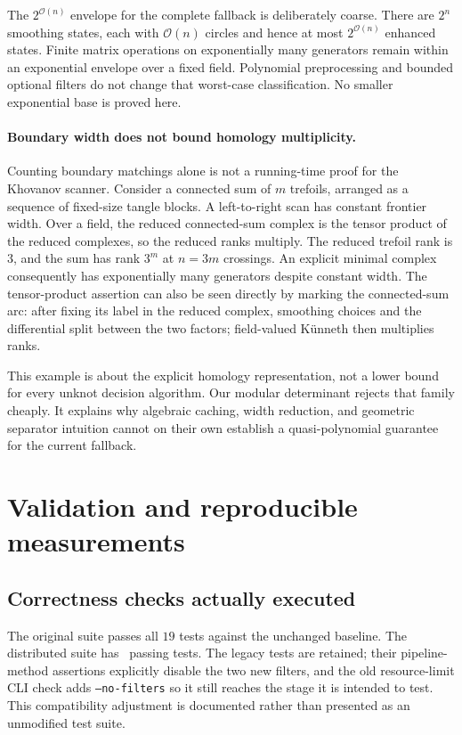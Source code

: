 \documentclass[11pt]{article}
\theoremstyle{remark}\newtheorem{remark}[theorem]{Remark}
\newcommand{\OO}{\mathcal O}
\newcommand{\code}[1]{\texttt{\small #1}}
\begin{document}
The $2^{\OO(n)}$ envelope for the complete fallback is deliberately coarse.
There are $2^n$ smoothing states, each with $\OO(n)$ circles and hence at
most $2^{\OO(n)}$ enhanced states. Finite matrix operations on exponentially
many generators remain within an exponential envelope over a fixed field.
Polynomial preprocessing and bounded optional filters do not change that
worst-case classification. No smaller exponential base is proved here.

\paragraph{Boundary width does not bound homology multiplicity.}
Counting boundary matchings alone is not a running-time proof for the
Khovanov scanner. Consider a connected sum of $m$ trefoils, arranged as a
sequence of fixed-size tangle blocks. A left-to-right scan has constant
frontier width. Over a field, the reduced connected-sum complex is the
tensor product of the reduced complexes, so the reduced ranks multiply.
The reduced trefoil rank is $3$, and the sum has rank $3^m$ at $n=3m$
crossings. An explicit minimal complex consequently has exponentially
many generators despite constant width. The tensor-product assertion can
also be seen directly by marking the connected-sum arc: after fixing its
label in the reduced complex, smoothing choices and the differential split
between the two factors; field-valued K\"unneth then multiplies ranks.

This example is about the explicit homology representation, not a lower
bound for every unknot decision algorithm. Our modular determinant rejects
that family cheaply. It explains why algebraic caching, width reduction,
and geometric separator intuition cannot on their own establish a
quasi-polynomial guarantee for the current fallback.

\section{Validation and reproducible measurements}
\label{sec:validation}

\subsection{Correctness checks actually executed}

The original suite passes all $19$ tests against the unchanged baseline.
The distributed suite has \TestCount\ passing tests. The legacy tests are
retained; their pipeline-method assertions explicitly disable the two new
filters, and the old resource-limit CLI check adds \code{--no-filters} so
it still reaches the stage it is intended to test. This compatibility
adjustment is documented rather than presented as an unmodified test suite.
\end{document}

